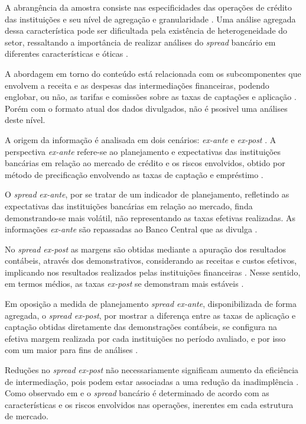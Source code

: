 \documentclass[12pt,12pt,openright,oneside,a4paper,chapter=TITLE,section=TITLE,subsection=TITLE,subsubsection=TITLE,english,french,spanish,portugues,sumario=tradicional]{abntex2}
\begin{document}
A abrangência da amostra consiste nas especificidades das operações de crédito das instituições e seu nível de agregação e granularidade \cite{costa;nakane:2004}. Uma análise agregada dessa característica pode ser dificultada pela existência de heterogeneidade do setor, ressaltando a importância de realizar análises do \emph{spread} bancário em diferentes características e óticas \cite{block:2000}.

A abordagem em torno do conteúdo está relacionada com os subcomponentes que
envolvem a receita e as despesas das intermediações financeiras, podendo
englobar, ou não, as tarifas e comissões sobre as taxas de captações e
aplicação \cite{block:2000}. Porém com o formato atual dos dados divulgados, não é psosivel uma análises deste nível.

A origem da informação é analisada em dois cenários: \emph{ex-ante} e \emph{ex-post} \cite{kunt:1999, levine:1997}. A perspectiva \emph{ex-ante} refere-se ao planejamento e expectativas das instituições bancárias em relação ao mercado de crédito e os riscos envolvidos, obtido por método de precificação envolvendo as taxas de captação e empréstimo \cite{durigan:2018, leal:2006, dantas:2012}.

O \emph{spread} \emph{ex-ante}, por se tratar de um indicador de planejamento, refletindo
as expectativas das instituições bancárias em relação ao mercado, finda
demonstrando-se mais volátil, não representando as taxas efetivas realizadas.
As informações \emph{ex-ante} são repassadas ao Banco Central que as divulga
\cite{durigan:2018, leal:2006, dantas:2012}.

No \emph{spread ex-post} as margens são obtidas mediante a apuração dos resultados contábeis, através dos demonstrativos, considerando as receitas e custos efetivos, implicando nos resultados realizados pelas instituições financeiras \cite{kunt:1999, durigan:2018}. Nesse sentido, em termos médios, as taxas \emph{ex-post} se demonstram mais estáveis \cite{leal:2006, dantas:2012}.

Em oposição a medida de planejamento \emph{spread ex-ante}, disponibilizada de forma agregada, o \emph{spread ex-post}, por mostrar a diferença entre as taxas de aplicação e captação obtidas diretamente das demonstrações contábeis, se configura na efetiva margem realizada por cada instituições no período avaliado, e por isso com um maior para fins de análises \cite{dantas:2012}.

Reduções no \emph{spread} \emph{ex-post} não necessariamente significam aumento da
eficiência de intermediação, pois podem estar associadas a uma
redução da inadimplência \cite{kunt:1999}. Como observado em
\textcite{klein:1971} e \textcite{ho-saunders:1981} o \emph{spread} bancário é
determinado de acordo com as características e os riscos envolvidos nas
operações, inerentes em cada estrutura de mercado.
\end{document}
